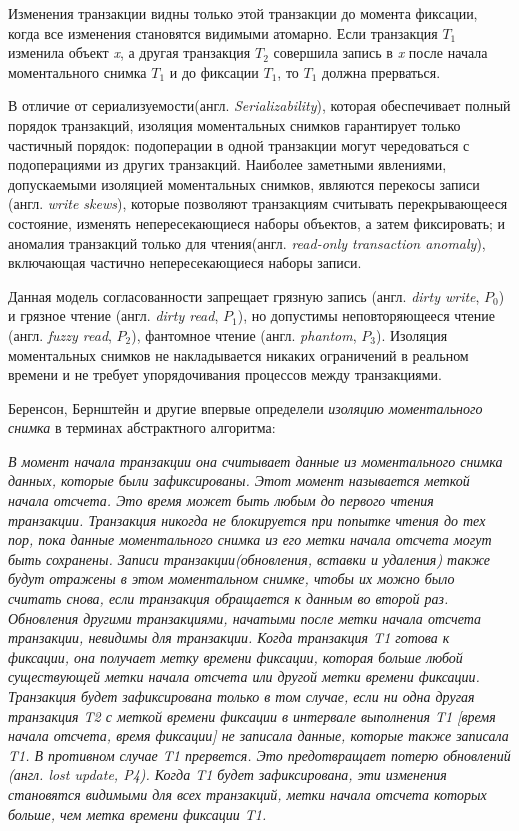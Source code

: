 \documentclass[14pt,  openany]{book}
\begin{document}
\par Изменения транзакции видны только этой транзакции до момента фиксации, когда все изменения становятся видимыми атомарно. Если транзакция $T_1$ изменила объект \textit{x}, а другая транзакция $T_2$ совершила запись в \textit{x} после начала моментального снимка $T_1$ и до фиксации $T_1$, то $T_1$ должна прерваться.
\par
В отличие от сериализуемости(англ. \textit{Serializability}), которая обеспечивает полный порядок транзакций, изоляция моментальных снимков гарантирует только частичный порядок: подоперации в одной транзакции могут чередоваться с подоперациями из других транзакций. Наиболее заметными явлениями, допускаемыми изоляцией моментальных снимков, являются перекосы записи (англ. \textit{write skews}), которые позволяют транзакциям считывать перекрывающееся состояние, изменять непересекающиеся наборы объектов, а затем фиксировать; и аномалия транзакций только для чтения(англ.  \textit{read-only transaction anomaly}), включающая частично непересекающиеся наборы записи.
\par
Данная модель согласованности запрещает грязную запись (англ. \textit{dirty write}, $P_0$) и грязное чтение (англ.  \textit{dirty read}, $P_1$), но допустимы неповторяющееся чтение (англ. \textit{fuzzy read}, $P_2$), фантомное чтение (англ. \textit{phantom}, $P_3$)\cite{adya99:_weak_consis}. Изоляция моментальных снимков не накладывается никаких ограничений в реальном времени и не требует упорядочивания процессов между транзакциями.
\par Беренсон, Бернштейн и другие \cite {BerensonIsolationLevels} впервые определели \textit{изоляцию моментального снимка} в терминах абстрактного алгоритма: 
\begin{displayquote}
\textit{В момент начала транзакции она считывает данные из моментального снимка данных, которые были зафиксированы. Этот момент называется меткой начала отсчета. Это время может быть любым до первого чтения транзакции. Транзакция никогда не блокируется при попытке чтения до тех пор, пока данные моментального снимка из его метки начала отсчета могут быть сохранены. Записи транзакции(обновления, вставки и удаления) также будут отражены в этом моментальном снимке, чтобы их можно было считать снова, если транзакция обращается к данным во второй раз. Обновления другими транзакциями, начатыми после метки начала отсчета транзакции, невидимы для транзакции. 
\newline \newline
Когда транзакция T1 готова к фиксации, она получает метку времени фиксации, которая больше любой существующей метки начала отсчета или другой метки времени фиксации. Транзакция будет зафиксирована только в том случае, если ни одна другая транзакция T2 с меткой времени фиксации в интервале выполнения T1 [время начала отсчета, время фиксации] не записала данные, которые также записала T1. В противном случае T1 прервется. Это предотвращает потерю обновлений (англ. \textit{lost update}, P4). Когда T1 будет зафиксирована, эти изменения становятся видимыми для всех транзакций, метки начала отсчета которых больше, чем метка времени фиксации T1.
}
\end{displayquote}
\end{document}
